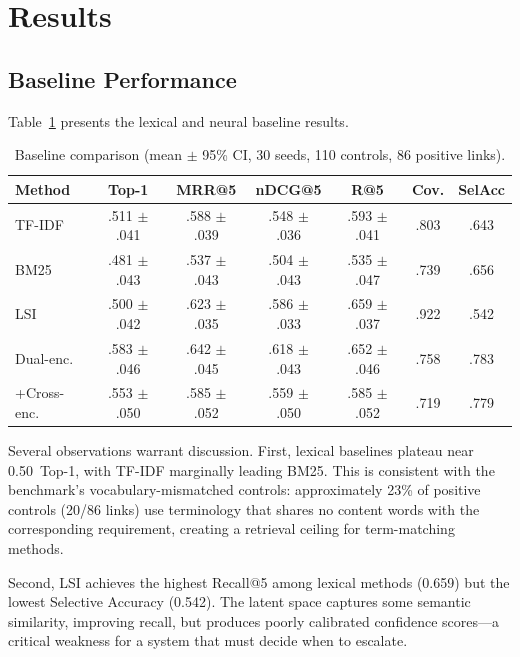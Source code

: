 \documentclass{sn-jnl}
\begin{document}
\section{Results}
\label{sec:results}

\subsection{Baseline Performance}

Table~\ref{tab:baselines} presents the lexical and neural baseline results.

\begin{table}[t]
\caption{Baseline comparison (mean $\pm$ 95\% CI, 30 seeds, 110 controls, 86 positive links).}
\label{tab:baselines}
\centering
\small
\begin{tabular}{@{}lcccccc@{}}
\toprule
Method & Top-1 & MRR@5 & nDCG@5 & R@5 & Cov. & SelAcc \\
\midrule
TF-IDF        & .511 $\pm$ .041 & .588 $\pm$ .039 & .548 $\pm$ .036 & .593 $\pm$ .041 & .803 & .643 \\
BM25          & .481 $\pm$ .043 & .537 $\pm$ .043 & .504 $\pm$ .043 & .535 $\pm$ .047 & .739 & .656 \\
LSI~\cite{MarcusMaletic2003} & .500 $\pm$ .042 & .623 $\pm$ .035 & .586 $\pm$ .033 & .659 $\pm$ .037 & .922 & .542 \\
\midrule
Dual-enc.~\cite{Reimers2019} & .583 $\pm$ .046 & .642 $\pm$ .045 & .618 $\pm$ .043 & .652 $\pm$ .046 & .758 & .783 \\
+Cross-enc.   & .553 $\pm$ .050 & .585 $\pm$ .052 & .559 $\pm$ .050 & .585 $\pm$ .052 & .719 & .779 \\
\bottomrule
\end{tabular}
\end{table}

Several observations warrant discussion.
First, lexical baselines plateau near 0.50~Top-1, with TF-IDF marginally leading BM25.
This is consistent with the benchmark's vocabulary-mismatched controls: approximately 23\% of positive controls (20/86 links) use terminology that shares no content words with the corresponding requirement, creating a retrieval ceiling for term-matching methods.

Second, LSI achieves the highest Recall@5 among lexical methods (0.659) but the lowest Selective Accuracy (0.542).
The latent space captures some semantic similarity, improving recall, but produces poorly calibrated confidence scores---a critical weakness for a system that must decide when to escalate.
\end{document}
